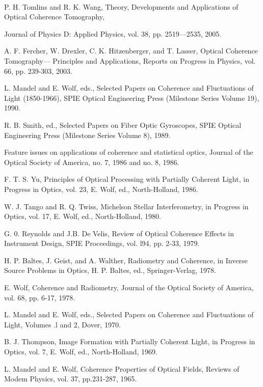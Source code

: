 \documentclass[UTF8]{ctexart}
\numberwithin{figure}{subsection}
\numberwithin{table}{subsection}
\begin{document}
\begin{spacing}{0.5}
\begin{hangparas}{0.25cm}{1}
\bigbreak{}\\
\par P. H. Tomlins and R. K. Wang, Theory, Developments and Applications of Optical Coherence Tomography,
\par Journal of Physics D: Applied Physics, vol. 38, pp. 2519—2535, 2005.\\
\par A. F. Fercher, W. Drexler, C. K. Hitzenberger, and T. Lasser, Optical Coherence Tomography—
Principles and Applications, Reports on Progress in Physics, vol. 66, pp. 239-303, 2003.\\
\par L. Mandel and E. Wolf, eds., Selected Papers on Coherence and Fluctuations of Light (1850-1966), SPIE Optical Engineering Press (Milestone Series Volume 19), 1990.\\
\par R. B. Smith, ed., Selected Papers on Fiber Optic Gyroscopes, SPIE Optical Engineering Press (Milestone Series Volume 8), 1989.\\
\par Feature issues on applications of coherence and statistical optics, Journal of the Optical Society of
America, no. 7, 1986 and no. 8, 1986.\\
\par F. T. S. Yu, Principles of Optical Processing with Partially Coherent Light, in Progress in Optics,
vol. 23, E. Wolf, ed., North-Holland, 1986.\\
\par W. J. Tango and R. Q. Twiss, Michelson Stellar Interferometry, in Progress in Optics, vol. 17, E. Wolf,
ed., North-Holland, 1980.\\
\par G. 0. Reynolds and J.B. De Velis, Review of Optical Coherence Effects in Instrument Design, SPIE
Proceedings, vol. l94, pp. 2-33, 1979.\\
\par H. P. Baltes, J. Geist, and A. Walther, Radiometry and Coherence, in Inverse Source Problems in
Optics, H. P. Baltes, ed., Springer-Verlag, 1978.\\
\par E. Wolf, Coherence and Radiometry, Journal of the Optical Society of America, vol. 68, pp. 6-17,
1978.\\
\par L. Mandel and E. Wolf, eds., Selected Papers on Coherence and Fluctuations of Light, Volumes .l
and 2, Dover, 1970.\\
\par B. J. Thompson, Image Formation with Partially Coherent Light, in Progress in Optics, vol. 7,
E. Wolf, ed., North-Holland, 1969.\\
\par L. Mandel and E. Wolf, Coherence Properties of Optical Fields, Reviews of Modem Physics, vol. 37,
pp.231-287, 1965.\\
\end{hangparas}
\end{spacing}
\end{document}
